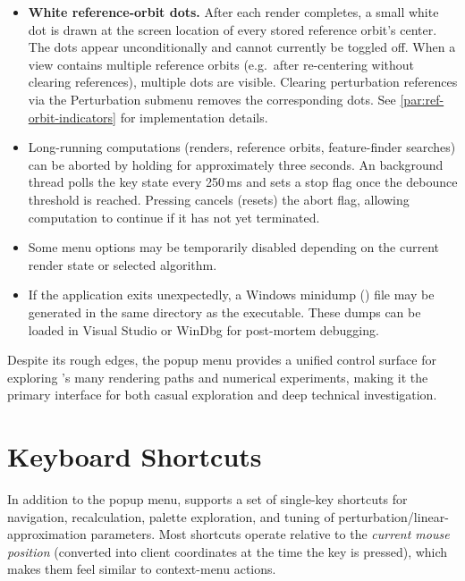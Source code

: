 \begin{itemize}
  \item \textbf{White reference-orbit dots.}  After each render completes, a
  small white dot is drawn at the screen location of every stored reference
  orbit's center.  The dots appear unconditionally and cannot currently be
  toggled off.  When a view contains multiple reference orbits (e.g.\ after
  re-centering without clearing references), multiple dots are visible.
  Clearing perturbation references via the Perturbation submenu removes the
  corresponding dots.  See \cref{par:ref-orbit-indicators} for implementation
  details.
  \item Long-running computations (renders, reference orbits, feature-finder
  searches) can be aborted by holding  for approximately three
  seconds.  An  background thread polls the key state every
  250\,ms and sets a stop flag once the debounce threshold is reached.  Pressing
   cancels (resets) the abort flag, allowing computation to
  continue if it has not yet terminated.
  \item Some menu options may be temporarily disabled depending on the current
  render state or selected algorithm.
  \item If the application exits unexpectedly, a Windows minidump
  () file may be generated in the same directory as the
  executable.  These dumps can be loaded in Visual Studio or WinDbg for
  post-mortem debugging.
\end{itemize}

Despite its rough edges, the popup menu provides a unified control surface for
exploring \FractalShark{}’s many rendering paths and numerical experiments, making
it the primary interface for both casual exploration and deep technical
investigation.


\section{Keyboard Shortcuts}
\label{sec:keyboard-shortcuts}

In addition to the popup menu, \FractalShark{} supports a set of single-key
shortcuts for navigation, recalculation, palette exploration, and tuning of
perturbation/linear-approximation parameters.  Most shortcuts operate relative
to the \emph{current mouse position} (converted into client coordinates at the
time the key is pressed), which makes them feel similar to context-menu actions.

